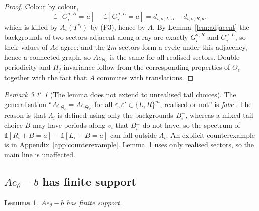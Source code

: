 \documentclass[11pt,reqno]{amsart}
\theoremstyle{plain}
\newtheorem{lem}[thm]{Lemma}
\theoremstyle{definition}
\theoremstyle{remark}
\theoremstyle{plain}
\theoremstyle{remark}
\newtheorem*{remnogen}{Remark 3.1$'$}
\theoremstyle{definition}
\numberwithin{equation}{section}
\newcommand{\one}{\mathbb{1}}
\begin{document}
\begin{proof}
Colour by colour,
\[\one[G_i^{\sigma,R}=a]-\one[G_i^{\sigma,L}=a]=d_{i,\sigma,L,a}-d_{i,\sigma,R,a},\]
which is killed by $A_i(T^{v_i})$ by \textup{(P3)}, hence by $A$.  By
Lemma~\ref{lem:adjacent} the backgrounds of two sectors adjacent along a ray are
exactly $G_i^{\sigma,R}$ and $G_i^{\sigma,L}$, so their values of $Ae$ agree;
and the $2m$ sectors form a cycle under this adjacency, hence a connected graph,
so $Ae_{\Theta_\epsilon}$ is the same for all realised sectors.  Double
periodicity and $H_j$-invariance follow from the corresponding properties of
$\Theta_\epsilon$ together with the fact that $A$ commutes with translations.
\end{proof}

\begin{remnogen}[The lemma does not extend to unrealised tail
choices]
The generalisation ``$Ae_{\Theta_\varepsilon}=Ae_{\Theta_{\varepsilon'}}$ for
all $\varepsilon,\varepsilon'\in\{L,R\}^m$, realised or not'' is \emph{false}.
The reason is that $\Lambda_i$ is defined using only the backgrounds $B_i^\pm$,
whereas a mixed tail choice $B$ may have periods along $v_i$ that $B_i^\pm$ do
not have, so the spectrum of $\one[R_i+B=a]-\one[L_i+B=a]$ can fall outside
$\Lambda_i$.  An explicit counterexample is in Appendix~\ref{app:counterexample}.
Lemma~\ref{lem:Ae-finite} uses only realised sectors, so the main line is
unaffected.
\end{remnogen}

\subsection{\texorpdfstring{$Ae_\theta-b$}{Ae-b} has finite
support}\label{ssec:Ae-finite}

\begin{lem}\label{lem:Ae-finite}
$Ae_\theta-b$ has finite support.
\end{lem}
\end{document}

